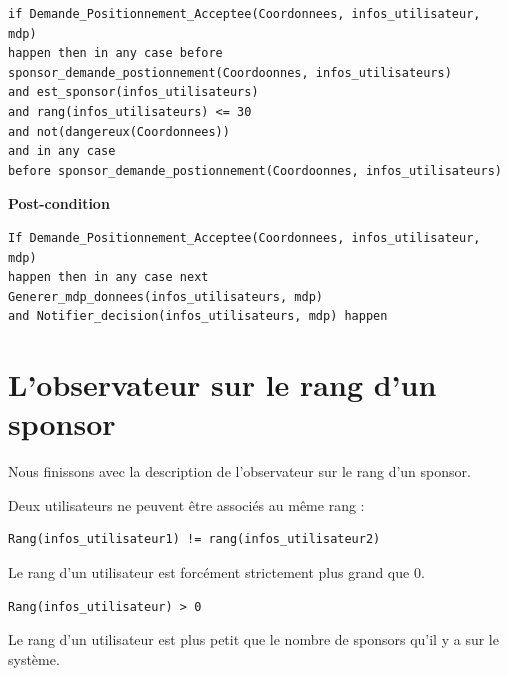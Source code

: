 \documentclass[11pt,a4paper]{article}
\begin{document}
\begin{lstlisting}
if Demande_Positionnement_Acceptee(Coordonnees, infos_utilisateur, mdp)
happen then in any case before 
sponsor_demande_postionnement(Coordoonnes, infos_utilisateurs) 
and est_sponsor(infos_utilisateurs) 
and rang(infos_utilisateurs) <= 30 
and not(dangereux(Coordonnees)) 
and in any case 
before sponsor_demande_postionnement(Coordoonnes, infos_utilisateurs)
\end{lstlisting}

\vspace{2cm}

\textbf{Post-condition} \\

\begin{lstlisting}
If Demande_Positionnement_Acceptee(Coordonnees, infos_utilisateur, mdp) 
happen then in any case next 
Generer_mdp_donnees(infos_utilisateurs, mdp) 
and Notifier_decision(infos_utilisateurs, mdp) happen
\end{lstlisting}

\newpage




\section{L'observateur sur le rang d'un sponsor}

Nous finissons avec la description de l'observateur sur le rang d'un sponsor.

\vspace{1cm}

Deux utilisateurs ne peuvent être associés au même rang : 

\begin{lstlisting}
Rang(infos_utilisateur1) != rang(infos_utilisateur2)
\end{lstlisting}

\vspace{1cm}

Le rang d’un utilisateur est forcément strictement plus grand que 0.

\begin{lstlisting}
Rang(infos_utilisateur) > 0
\end{lstlisting}

\vspace{1cm}

Le rang d’un utilisateur est plus petit que le nombre de sponsors qu’il y a sur le système.
\end{document}
